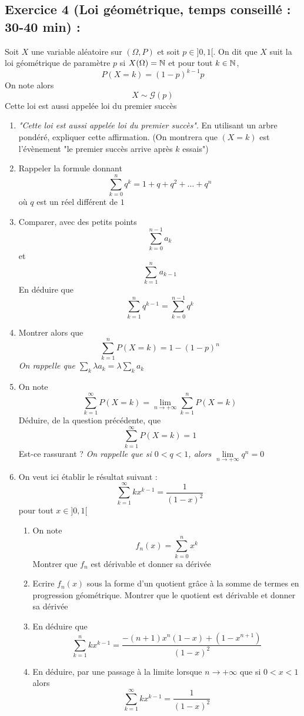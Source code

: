 \subsection*{Exercice 4 (Loi géométrique, temps conseillé : 30-40 min) : }
Soit $X$ une variable aléatoire sur $(\Omega,P)$ et soit $p \in ]0,1[$. On dit que $X$ suit la loi géométrique de paramètre $p$ si $X(\Omega) = \mathbb{N}$ et pour tout $k\in \mathbb{N}$, 
$$P(X=k) = (1-p)^{k-1}p$$
On note alors 
$$X \sim \mathcal{G}(p)$$
Cette loi est aussi appelée loi du premier succès
\begin{enumerate}
\item \emph{"Cette loi est aussi appelée loi du premier succès"}. En utilisant un arbre pondéré, expliquer cette affirmation. (On montrera que $(X=k)$ est l'évènement "le premier succès arrive après $k$ essais")
\item Rappeler la formule donnant 
$$\sum_{k=0}^n q^k = 1 + q + q^2 + \ldots + q^n$$
où $q$ est un réel différent de $1$
\item Comparer, avec des petits points 
$$\sum_{k=0}^{n-1} a_k$$ et $$\sum_{k=1}^n a_{k-1}$$
En déduire que 
$$\sum_{k=1}^n q^{k-1} = \sum_{k=0}^{n-1} q^k$$
\item Montrer alors que $$\sum_{k=1}^n P(X=k) = 1 - (1-p)^n$$
\emph{On rappelle que $\displaystyle \sum_{k} \lambda a_k = \lambda \sum_{k} a_k$}
\item On note $$\sum_{k=1}^\infty P(X=k) = \underset{n\rightarrow +\infty}{\lim} \sum_{k=1}^n P(X=k)$$ Déduire, de la question précédente, que $$\sum_{k=1}^\infty P(X=k) = 1$$ Est-ce rassurant ? \emph{On rappelle que si $0<q<1$, alors $\underset{n\rightarrow +\infty}{\lim} q^n =0$}
\item On veut ici établir le résultat suivant : 
$$\boxed{\sum_{k=1}^\infty kx^{k-1} = \frac{1}{(1-x)^2}}$$ pour tout $x\in ]0,1[$
\begin{enumerate}
\item On note $$f_n(x) = \sum_{k=0}^n x^k$$ Montrer que $f_n$ est dérivable et donner sa dérivée
\item Ecrire $f_n(x)$ sous la forme d'un quotient grâce à la somme de termes en progression géométrique. Montrer que le quotient est dérivable et donner sa dérivée
\item En déduire que 
$$\sum_{k=1}^n kx^{k-1} = \frac{-(n+1)x^n(1-x) +(1-x^{n+1})}{(1-x)^2}$$
\item En déduire, par une passage à la limite lorsque $n\rightarrow + \infty$ que si $0<x<1$ alors 
$$\sum_{k=1}^\infty kx^{k-1} = \frac{1}{(1-x)^2}$$
\end{enumerate}

\end{enumerate}
